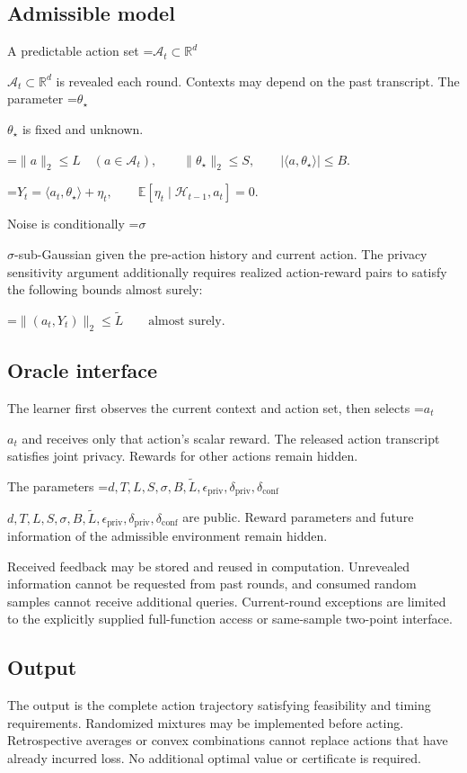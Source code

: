 \documentclass[10pt,a4paper]{article}
\newcommand{\AtlasMath}[1]{\par\begingroup\centering\setbox0=\hbox{$\displaystyle #1$}\ifdim\wd0>1.4\linewidth\typeout{ATLAS WIDE FORMULA: \the\wd0}\fi\ifdim\wd0>\linewidth\resizebox{\linewidth}{!}{\box0}\else\box0\fi\par\endgroup}
\newcommand{\AtlasInlineMath}[1]{\begingroup\setbox0=\hbox{$#1$}\ifdim\wd0>.4\linewidth\endgroup\AtlasMath{#1}\else\endgroup$#1$\fi}
\begin{document}
\subsection{Admissible model}
A predictable action set \AtlasInlineMath{\mathcal{A}_t\subset\mathbb{R}^d} is revealed each round. Contexts may depend on the past transcript. The parameter \AtlasInlineMath{\theta_\star} is fixed and unknown.


\AtlasMath{\|a\|_2\le L\quad(a\in\mathcal{A}_t),\qquad \|\theta_\star\|_2\le S,\qquad |\langle a,\theta_\star\rangle|\le B.}



\AtlasMath{Y_t=\langle a_t,\theta_\star\rangle+\eta_t,\qquad \mathbb{E}[\eta_t\mid\mathcal{H}_{t-1},a_t]=0.}


Noise is conditionally \AtlasInlineMath{\sigma}-sub-Gaussian given the pre-action history and current action. The privacy sensitivity argument additionally requires realized action-reward pairs to satisfy the following bounds almost surely:


\AtlasMath{\|(a_t,Y_t)\|_2\le\widetilde{L}\qquad\text{almost surely}.}


\subsection{Oracle interface}
The learner first observes the current context and action set, then selects \AtlasInlineMath{a_t} and receives only that action’s scalar reward. The released action transcript satisfies joint privacy. Rewards for other actions remain hidden.

The parameters \AtlasInlineMath{d,T,L,S,\sigma,B,\widetilde{L},\epsilon_{\mathrm{priv}},\delta_{\mathrm{priv}},\delta_{\mathrm{conf}}} are public. Reward parameters and future information of the admissible environment remain hidden.

Received feedback may be stored and reused in computation. Unrevealed information cannot be requested from past rounds, and consumed random samples cannot receive additional queries. Current-round exceptions are limited to the explicitly supplied full-function access or same-sample two-point interface.

\subsection{Output}
The output is the complete action trajectory satisfying feasibility and timing requirements. Randomized mixtures may be implemented before acting. Retrospective averages or convex combinations cannot replace actions that have already incurred loss. No additional optimal value or certificate is required.
\end{document}
